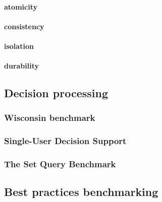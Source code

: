 \paragraph{atomicity}
\paragraph{consistency}
\paragraph{isolation}
\paragraph{durability}

\subsection{Decision processing}
\subsubsection{Wisconsin benchmark}

\subsubsection{Single-User Decision Support} %

\subsubsection{The Set Query Benchmark}

\subsection{Best practices benchmarking}

